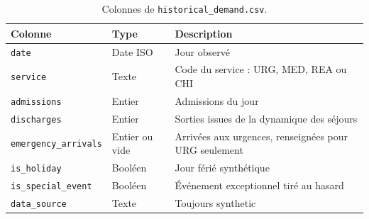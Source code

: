 \begin{table}[H]
    \centering
    \caption{Colonnes de \texttt{historical\_demand.csv}.}
    \label{tab:dictionnaire}
    \small
    \begin{tabular}{lll}
        \toprule
        \textbf{Colonne} & \textbf{Type} & \textbf{Description} \\
        \midrule
        \texttt{date} & Date ISO & Jour observé \\
        \texttt{service} & Texte & Code du service : URG, MED, REA ou CHI \\
        \texttt{admissions} & Entier & Admissions du jour \\
        \texttt{discharges} & Entier & Sorties issues de la dynamique des séjours \\
        \texttt{emergency\_arrivals} & Entier ou vide & Arrivées aux urgences, renseignées pour URG seulement \\
        \texttt{is\_holiday} & Booléen & Jour férié synthétique \\
        \texttt{is\_special\_event} & Booléen & Événement exceptionnel tiré au hasard \\
        \texttt{data\_source} & Texte & Toujours synthetic \\
        \bottomrule
    \end{tabular}
\end{table}
